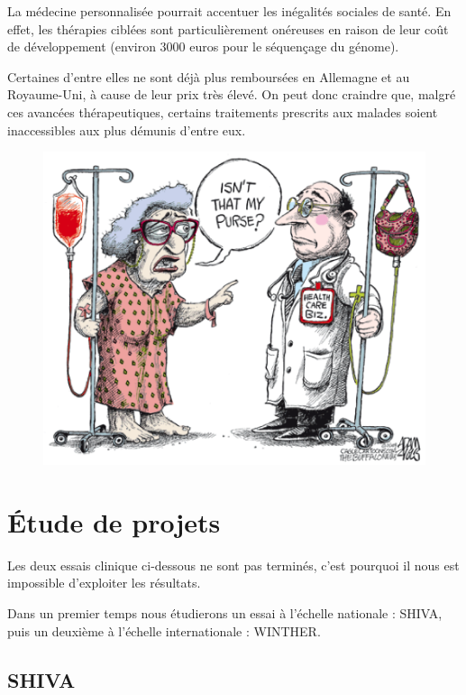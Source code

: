 \documentclass[12pt, openany]{report}
\begin{document}
La médecine personnalisée pourrait accentuer les inégalités sociales de santé. En effet, les thérapies ciblées sont particulièrement onéreuses en raison de leur coût de développement (environ 3000 euros pour le séquençage du génome). 

Certaines d’entre elles ne sont déjà plus remboursées en Allemagne et au Royaume-Uni, à cause de leur prix très élevé. On peut donc craindre que, malgré ces avancées thérapeutiques, certains traitements prescrits aux malades soient inaccessibles aux plus démunis d’entre eux.
 
 \begin{figure}[H]
\begin{center}
    \includegraphics[scale=0.7]{Images/im17.png}
\end{center}
\end{figure}

\chapter{\'Etude de projets}

Les deux essais clinique ci-dessous ne sont pas terminés, c’est pourquoi il nous est impossible d’exploiter les résultats. 

Dans un premier temps nous étudierons un essai à l’échelle nationale : SHIVA, puis un deuxième à l’échelle internationale : WINTHER.

\section{SHIVA}
\end{document}
